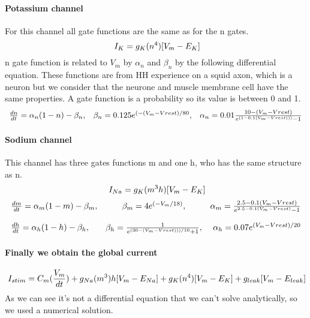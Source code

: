 \documentclass[a4paper,11pt]{report}
\begin{document}
 \paragraph{Potassium channel}
 For this channel all gate functions are the same as for the n gates.
 $$
 \ I_{K}=g_{K}(n^4)[V_{m}-E_{K}] \\
 $$
 n gate function is related to $V_{m}$ by $\alpha_{n}$ and $\beta_{n}$ by the following differential equation. These functions are from HH experience on a squid axon, which is a neuron but we consider that the neurone and muscle membrane cell have the same properties. A gate function is a probability so its value is between 0 and 1.  
 $$
 \begin{array}{l c r} 
 \frac{dn}{dt} = \alpha_{n}(1-n)- \beta_{n} , &  \beta_{n}= 0.125e^{(-(V_{m}-V{rest})/80} , & \alpha_{n}=0.01 \frac{10-(V_{m}-V{rest})}{e^{(1-0.1(V_{m}-V{rest})))}-1} \\
\end{array}
 $$

\paragraph{Sodium channel}
This channel has three gates functions m and one h, who has the same structure as n.
$$
 \ I_{Na}=g_{K}(m^{3}h)[V_{m}-E_{K}] \\
 $$
$$
\begin{array}{l c r}
\frac{dm}{dt} = \alpha_{m}(1-m)- \beta_{m} , & \beta_{m}= 4e^{(-V_{m}/18)} , & \alpha_{m}= \frac{2.5-0.1(V_{m}-V{rest})}{e^{2.5-0.1(V_{m}-V{rest})}-1} \\
\\
\frac{dh}{dt} = \alpha_{h}(1-h)- \beta_{h} , & \beta_{h}= \frac{1}{e^{(30-(V_{m}-V{rest})))/10}+1} , & \alpha_{h}=0.07 e^{(V_{m}-V{rest})/20} \\
\end{array}
$$
 
\paragraph{Finally we obtain the global current}
$$
\ I_{stim} = C_{m}(\frac{V_{m}}{dt})+g_{Na}(m^3)h[V_{m}-E_{Na}]+g_{K}(n^4)[V_{m}-E_{K}]+g_{leak}[V_{m}-E_{leak}] \\
$$
As we can see it's not a differential equation that we can't solve analytically, so we used a numerical solution.\\
\cite{Hodgkin1952} \cite{Tranquillo2009}
\end{document}
